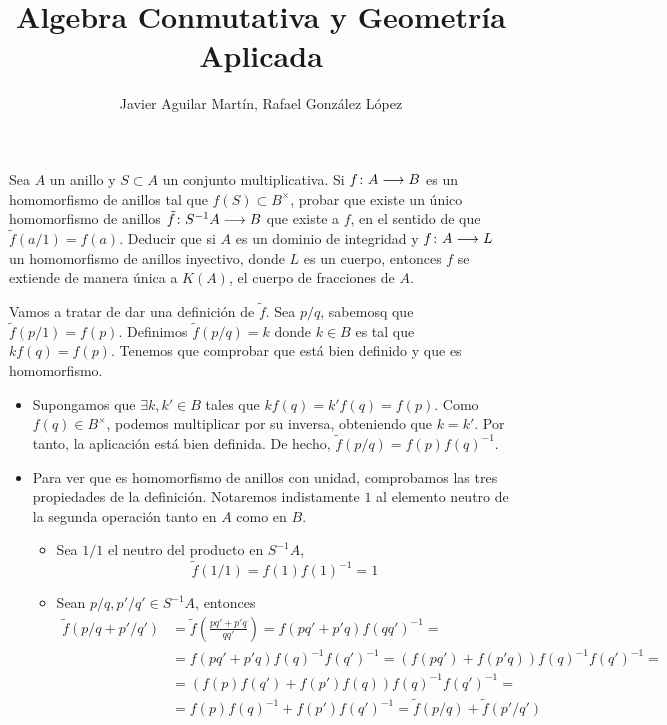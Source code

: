 \documentclass[twoside]{article}
\begin{document}
\title{Algebra Conmutativa y Geometría Aplicada}
\author{Javier Aguilar Martín, Rafael González López}
\maketitle

\begin{ejercicio}{1}
Sea $A$ un anillo y $S\subset A$ un conjunto multiplicativa. Si $f\colon{A}\longrightarrow{B}$ es un homomorfismo de anillos tal que $f(S)\subset B^\times$, probar que existe un único homomorfismo de anillos $\tilde{f}\colon{S^{-1}A}\longrightarrow{B}$ que existe a $f$, en el sentido de que $\tilde{f}(a/1) = f(a)$.
\newline
Deducir que si $A$ es un dominio de integridad y $f\colon{A}\longrightarrow{L}$ un homomorfismo de anillos inyectivo, donde $L$ es un cuerpo, entonces $f$ se extiende de manera única a $K(A)$, el cuerpo de fracciones de $A$.
\begin{solucion}
Vamos a tratar de dar una definición de $\tilde{f}$. Sea $p/q$, sabemosq que $\tilde{f}(p/1)=f(p)$. Definimos $\tilde{f}(p/q)=k$ donde $k\in B$ es tal que $kf(q)=f(p)$. Tenemos que comprobar que está bien definido y que es homomorfismo.
\begin{itemize}
\item Supongamos que $\exists k,k'\in B$ tales que $kf(q)=k'f(q)=f(p)$. Como $f(q)\in B^\times$, podemos multiplicar por su inversa, obteniendo que $k=k'$. Por tanto, la aplicación está bien definida. De hecho, $\tilde{f}(p/q)=f(p)f(q)^{-1}$.
\item Para ver que es homomorfismo de anillos con unidad, comprobamos las tres propiedades de la definición. Notaremos indistamente $1$ al elemento neutro de la segunda operación tanto en $A$ como en $B$.
\begin{itemize}
\item Sea $1/1$ el neutro del producto en $S^{-1}A$, 
$$\tilde{f}(1/1)=f(1)f(1)^{-1}=1$$
\item Sean $p/q,p'/q' \in S^{-1}A$, entonces
\begin{align*}
\tilde{f}(p/q+p'/q') &= 	\tilde{f}\left(\frac{pq'+p'q}{qq'}\right) = f(pq'+p'q)f(qq')^{-1} = \\
 &= f(pq'+p'q)f(q)^{-1}f(q')^{-1} =
(f(pq')+f(p'q))f(q)^{-1}f(q')^{-1} = \\
&= (f(p)f(q')+f(p')f(q))f(q)^{-1}f(q')^{-1}  =\\
 &= f(p)f(q)^{-1}+f(p')f(q')^{-1} = \tilde{f}(p/q)+\tilde{f}(p'/q')
\end{align*}


\end{itemize}
\end{itemize}
\end{solucion}
\end{ejercicio}
\end{document}
